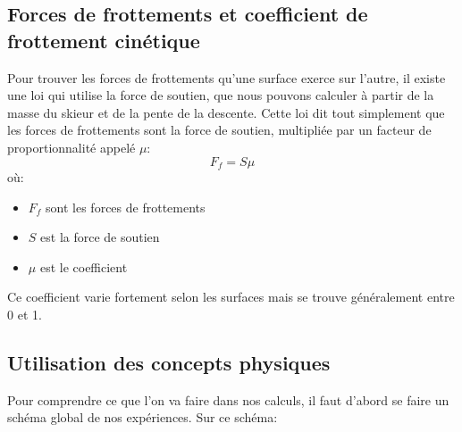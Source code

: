 \documentclass{article}
\begin{document}
\subsection{Forces de frottements et coefficient de frottement cinétique}

Pour trouver les forces de frottements qu'une surface exerce sur l'autre, il existe une loi qui utilise la force de soutien, que nous pouvons calculer à partir de la masse du skieur et de la pente de la descente. Cette loi dit tout simplement que les forces de frottements sont la force de soutien, multipliée par un facteur de proportionnalité appelé $\mu$:
\begin{equation}
    \label{Coef-frotte-cin}
    F_f = S\mu
\end{equation}
où:
\begin{itemize}
    \item $F_f$ sont les forces de frottements
    \item $S$ est la force de soutien
    \item $\mu$ est le coefficient
\end{itemize}

Ce coefficient varie fortement selon les surfaces mais se trouve généralement entre 0 et 1.






\subsection{Utilisation des concepts physiques}

Pour comprendre ce que l'on va faire dans nos calculs, il faut d'abord se faire un schéma global de nos expériences. Sur ce schéma:
\end{document}
